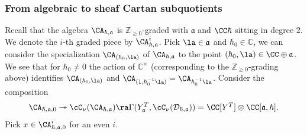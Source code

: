 \documentclass[12pt]{amsart}
\begin{document}
\subsubsection{From algebraic to sheaf Cartan subquotients}
Recall that the algebra $\CA_{\hbar,\mathfrak{a}}$ is $\mathbb{Z}_{\geqslant 0}$-graded with $\mathfrak{a}$ and $\CC \hbar$ sitting in degree $2$. We denote the $i$-th graded piece by $\CA_{\hbar,\mathfrak{a}}^{i}$. Pick $\la \in \mathfrak{a}$ and $\hbar_0 \in \mathbb{C}$, we can consider the specialization $\CA_{(\hbar_0, \la)}$ of $\CA_{\hbar,\mathfrak{a}}$ to the point $(\hbar_0, \la) \in \CC\oplus \mathfrak{a}$. We see that for $\hbar_0 \neq 0$ the action of $\mathbb{C}^\times$ (corresponding to the $\mathbb{Z}_{\geqslant 0}$-grading above) identifies $\CA_{(\hbar_0, \la)}$ and $\CA_{(1, \hbar_0^{-1}\la)}=\CA_{\hbar_0^{-1}\la}$. Consider the composition
\begin{equation}\label{comp_cart_alg_to_sh}
\CA_{\hbar,\mathfrak{a},0} \twoheadrightarrow \cC_\nu(\CA_{\hbar,\mathfrak{a}}) \ra \Gamma(Y_{\mathfrak{a}}^{T},\cC_\nu(\mathcal{D}_{\hbar,\mathfrak{a}}))=\CC[Y^T] \otimes \CC[\mathfrak{a},\hbar].
\end{equation}
Pick $x \in \CA_{\hbar,\mathfrak{a},0}^{i}$ for an even $i$. 
\end{document}
